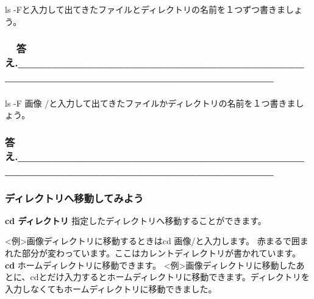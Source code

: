 \documentclass[a4paper,dvipdfmx]{jarticle}
\begin{document}
ls
{}-Fと入力して出てきたファイルとディレクトリの名前を１つずつ書きましょう。

\subsubsection{}
\subsubsection{}
\subsubsection[\ \ 答え.\_\_\_\_\_\_\_\_\_\_\_\_\_\_\_\_\_\_\_\_\_\_\_\_\_\_\_\_\_\_\_\_\_\_\_\_\_\_\_\_\_\_\_\_\_\_\_\_\_\_\_\_\_\_\_\_\_\_\_\_\_\_\_\_]{\ \ 答え.\_\_\_\_\_\_\_\_\_\_\_\_\_\_\_\_\_\_\_\_\_\_\_\_\_\_\_\_\_\_\_\_\_\_\_\_\_\_\_\_\_\_\_\_\_\_\_\_\_\_\_\_\_\_\_\_\_\_\_\_\_\_\_\_}
\subsubsection{}
ls {}-F 画像
/と入力して出てきたファイルかディレクトリの名前を１つ書きましょう。

\subsubsection{}
\subsubsection{}
\subsubsection{答え.\_\_\_\_\_\_\_\_\_\_\_\_\_\_\_\_\_\_\_\_\_\_\_\_\_\_\_\_\_\_\_\_\_\_\_\_\_\_\_\_\_\_\_\_\_\_\_\_\_\_\_\_\_\_\_\_\_\_\_\_\_\_\_\_}
\clearpage\subsubsection{ディレクトリへ移動してみよう}
\textbf{cd ディレクトリ}\newline
指定したディレクトリへ移動することができます。

{\textless}例{\textgreater}画像ディレクトリに移動するときはcd
画像/と入力します。\newline
赤まるで囲まれた部分が変わっています。ここはカレントディレクトリが書かれています。\newline
\textbf{cd}\newline
ホームディレクトリに移動できます。\newline
{\textless}例{\textgreater}画像ディレクトリに移動したあとに、cdとだけ入力するとホームディレクトリに移動できます。ディレクトリを入力しなくてもホームディレクトリに移動できました。
\end{document}
